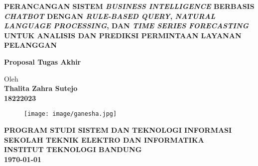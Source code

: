 \documentclass[12pt,a4paper,oneside]{book}
\begin{document}
\begin{titlepage}
\begin{center}

    
    {\large\bfseries PERANCANGAN SISTEM \textit{BUSINESS INTELLIGENCE} BERBASIS \textit{CHATBOT} DENGAN \textit{RULE-BASED QUERY}, \textit{NATURAL LANGUAGE PROCESSING}, DAN \textit{TIME SERIES FORECASTING} UNTUK ANALISIS DAN PREDIKSI PERMINTAAN LAYANAN PELANGGAN}\\
     \vspace{4cm}

    {\Large \textbf{Proposal Tugas Akhir}}\\


    \vspace{2cm}
    
    
    {\large Oleh}\\[0.3cm]
    \textbf{
    {\large Thalita Zahra Sutejo}\\
    {\large 18222023}
    }\\

    \vspace{2cm}
    
    \begin{figure}[h]
    \centering
    \texttt{[image: image/ganesha.jpg]}
    \end{figure}
    
    
    \vfill

    \textbf{
    {\large PROGRAM STUDI SISTEM DAN TEKNOLOGI INFORMASI}\\
    {\large SEKOLAH TEKNIK ELEKTRO DAN INFORMATIKA}\\
    {\large INSTITUT TEKNOLOGI BANDUNG}\\
    {\large {}\today}
    }
\end{center}
\end{titlepage}
\end{document}
